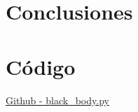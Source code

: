 \documentclass[12pt,letterpaper]{article}
\begin{document}
\begin{multicols}{2}
\section*{Conclusiones}


\nocite{*}
\section*{Código}
\href{https://github.com/giovannilopez9808/Notas_Agosto_2020/blob/master/AMC/Reto1/black_body.py}{Github - black\_body.py}
\end{multicols}
\end{document}
